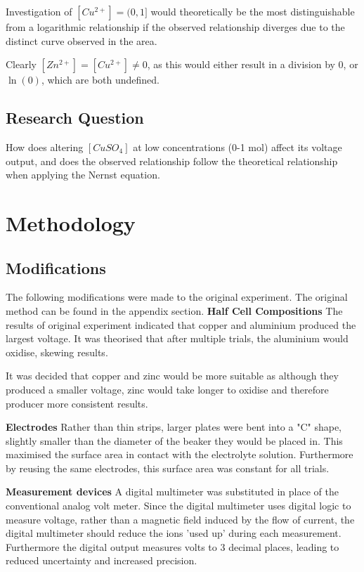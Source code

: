 \documentclass[11pt,a4paper]{article}
\begin{document}
Investigation of $[Cu^{2+}]=(0, 1]$ would theoretically be the most distinguishable from a logarithmic relationship if the observed relationship diverges due to the distinct curve observed in the area. 

Clearly $[Zn^{2+}]=[Cu^{2+}]\neq 0$, as this would either result in a division by 0, or $\ln(0)$, which are both undefined. 
\subsection{Research Question}
How does altering $[CuSO_4]$ at low concentrations (0-1 mol) affect its voltage output, and does the observed relationship follow the theoretical relationship when applying the Nernst equation.
\section{Methodology}
\subsection{Modifications}

The following modifications were made to the original experiment. The original method can be found in the appendix section.\newline
\textbf{Half Cell Compositions}\newline
The results of original experiment indicated that copper and aluminium produced the largest voltage. It was theorised that after multiple trials, the aluminium would oxidise, skewing results.

It was decided that copper and zinc would be more suitable as although they produced a smaller voltage, zinc would take longer to oxidise and therefore producer more consistent results.

\textbf{Electrodes}\newline
Rather than thin strips, larger plates were bent into a "C" shape, slightly smaller than the diameter of the beaker they would be placed in. This maximised the surface area in contact with the electrolyte solution. Furthermore by reusing the same electrodes, this surface area was constant for all trials.

\textbf{Measurement devices}\newline
A digital multimeter was substituted in place of the conventional analog volt meter. Since the digital multimeter uses digital logic to measure voltage, rather than a magnetic field induced by the flow of current, the digital multimeter should reduce the ions 'used up' during each measurement. Furthermore the digital output measures volts to 3 decimal places, leading to reduced uncertainty and increased precision. 
\end{document}
